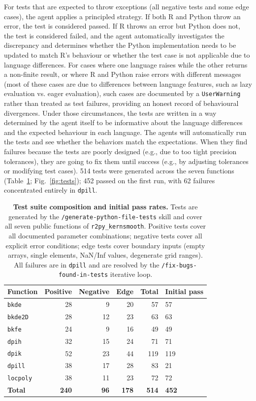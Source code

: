 \documentclass[12pt,a4paper]{article}
\newcommand{\skill}[1]{\texttt{/#1}}
\newcommand{\pkg}[1]{\texttt{#1}}
\begin{document}
For tests that are expected to throw exceptions (all negative tests and some edge cases), the agent applies a principled strategy. If both R and Python throw an error, the test is considered passed. If R throws an error but Python does not, the test is considered failed, and the agent automatically investigates the discrepancy and determines whether the Python implementation needs to be updated to match R's behaviour or whether the test case is not applicable due to language differences. For cases where one language raises while the other returns a non-finite result, or where R and Python raise errors with different messages (most of these cases are due to differences between language features, such as lazy evaluation vs. eager evaluation), such cases are documented by a \texttt{UserWarning} rather than treated as test failures, providing an honest record of behavioural divergences. Under those circumstances, the tests are written in a way determined by the agent itself to be informative about the language differences and the expected behaviour in each language. The agents will automatically run the tests and see whether the behaviors match the expectations. When they find failures because the tests are poorly designed (e.g., due to too tight precision tolerances), they are going to fix them until success (e.g., by adjusting tolerances or modifying test cases). 514 tests were generated across the seven functions (Table~\ref{tab:tests}; Fig.~\ref{fig:tests}); 452 passed on the first run, with 62 failures concentrated entirely in \texttt{dpill}.

\begin{table}[htbp]
\centering
\begin{tabular}{lrrrrl}
\toprule
Function & Positive & Negative & Edge & Total & Initial pass \\
\midrule
\texttt{bkde}    & 28 &  9 & 20 &  57 & 57 \\
\texttt{bkde2D}  & 28 & 12 & 23 &  63 & 63 \\
\texttt{bkfe}    & 24 &  9 & 16 &  49 & 49 \\
\texttt{dpih}    & 32 & 15 & 24 &  71 & 71 \\
\texttt{dpik}    & 52 & 23 & 44 & 119 & 119 \\
\texttt{dpill}   & 38 & 17 & 28 &  83 & 21 \\
\texttt{locpoly} & 38 & 11 & 23 &  72 & 72 \\
\midrule
\textbf{Total}   & \textbf{240} & \textbf{96} & \textbf{178} & \textbf{514} & \textbf{452} \\
\bottomrule
\end{tabular}
\caption{\textbf{Test suite composition and initial pass rates.} Tests are generated by the \skill{generate-python-file-tests} skill and cover all seven public functions of \pkg{r2py\_kernsmooth}. Positive tests cover all documented parameter combinations; negative tests cover all explicit error conditions; edge tests cover boundary inputs (empty arrays, single elements, NaN/Inf values, degenerate grid ranges). All failures are in \texttt{dpill} and are resolved by the \skill{fix-bugs-found-in-tests} iterative loop.}
\label{tab:tests}
\end{table}
\end{document}
